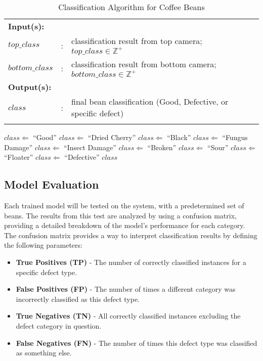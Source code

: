 \begin{table}[H]
	\caption{Classification Algorithm for Coffee Beans}
	\label{tab:pseudocode_classification}
	{\footnotesize
	\begin{tabular}{lll}
	\hline
	\hline
	{\bfseries Input(s):} & & \\
	$top\_class$ & : & classification result from top camera; $top\_class \in \mathbb{Z}^{+}$ \\
	$bottom\_class$ & : & classification result from bottom camera; $bottom\_class \in \mathbb{Z}^{+}$ \\
	\hline
	{\bfseries Output(s):} & & \\
	$class$ & : & final bean classification (Good, Defective, or specific defect) \\
	\hline
	\hline
	\\
	\end{tabular}
	}
	\begin{algorithmic}[1]
	{\footnotesize
			\STATE $class \Leftarrow$ ``Good''
			\STATE $class \Leftarrow$ ``Dried Cherry''
			\STATE $class \Leftarrow$ ``Black''
			\STATE $class \Leftarrow$ ``Fungus Damage''
			\STATE $class \Leftarrow$ ``Insect Damage''
			\STATE $class \Leftarrow$ ``Broken''
			\STATE $class \Leftarrow$ ``Sour''
			\STATE $class \Leftarrow$ ``Floater''
		\ELSE
			\STATE $class \Leftarrow$ ``Defective''
		\ENDIF
		\RETURN $class$
	}	
	\end{algorithmic}
\end{table}


\subsection{Model Evaluation}
Each trained model will be tested on the system, with a predetermined set of beans. The results from this test are analyzed by using a confusion matrix, providing a detailed breakdown of the model’s performance for each category. The confusion matrix provides a way to interpret classification results by defining the following parameters:
\begin{itemize}
    \item \textbf{True Positives (TP)} - The number of correctly classified instances for a specific defect type.
    \item \textbf{False Positives (FP)} - The number of times a different category was incorrectly classified as this defect type.
    \item \textbf{True Negatives (TN)} - All correctly classified instances excluding the defect category in question.
    \item \textbf{False Negatives (FN)} - The number of times this defect type was classified as something else.
\end{itemize}

